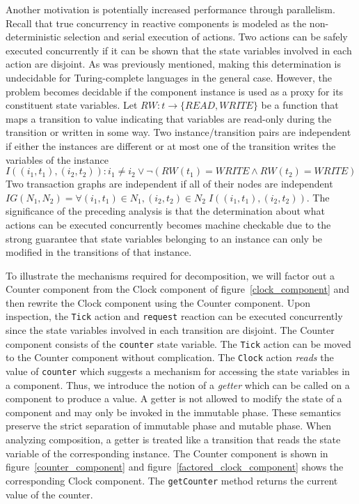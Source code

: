 Another motivation is potentially increased performance through parallelism.
Recall that true concurrency in reactive components is modeled as the non-deterministic selection and serial execution of actions.
Two actions can be safely executed concurrently if it can be shown that the state variables involved in each action are disjoint.
As was previously mentioned, making this determination is undecidable for Turing-complete languages in the general case.
However, the problem becomes decidable if the component instance is used as a proxy for its constituent state variables.
Let $RW: t \to \{ READ, WRITE \}$ be a function that maps a transition to value indicating that variables are read-only during the transition or written in some way.
Two instance/transition pairs are independent if either the instances are different or at most one of the transition writes the variables of the instance
\begin{displaymath}
I((i_1, t_1), (i_2, t_2)): i_1 \ne i_2 \lor \lnot (RW(t_1) = WRITE \land RW(t_2) = WRITE)
\end{displaymath}
Two transaction graphs are independent if all of their nodes are independent $IG(N_1, N_2) = \forall (i_1, t_1) \in N_1, (i_2, t_2) \in N_2 \; I((i_1, t_1), (i_2, t_2))$.
The significance of the preceding analysis is that the determination about what actions can be executed concurrently becomes machine checkable due to the strong guarantee that state variables belonging to an instance can only be modified in the transitions of that instance.

To illustrate the mechanisms required for decomposition, we will factor out a Counter component from the Clock component of figure~\ref{clock_component} and then rewrite the Clock component using the Counter component.
Upon inspection, the \verb+Tick+ action and \verb+request+ reaction can be executed concurrently since the state variables involved in each transition are disjoint.
The Counter component consists of the \verb+counter+ state variable.
The \verb+Tick+ action can be moved to the Counter component without complication.
The \verb+Clock+ action \emph{reads} the value of \verb+counter+ which suggests a mechanism for accessing the state variables in a component.
Thus, we introduce the notion of a \emph{getter} which can be called on a component to produce a value.
A getter is not allowed to modify the state of a component and may only be invoked in the immutable phase.
These semantics preserve the strict separation of immutable phase and mutable phase.
When analyzing composition, a getter is treated like a transition that reads the state variable of the corresponding instance.
The Counter component is shown in figure~\ref{counter_component} and figure~\ref{factored_clock_component} shows the corresponding Clock component.
The \verb+getCounter+ method returns the current value of the counter.

